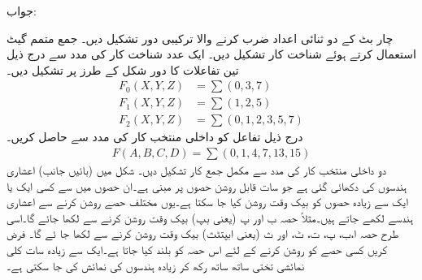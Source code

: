  جواب:
 \begin{center}
 \end{center}
 چار بٹ کے دو ثنائی اعداد ضرب کرنے والا ترکیبی دور تشکیل دیں۔
 جمع متمم گیٹ استعمال کرتے ہوئے  شناخت کار تشکیل دیں۔
ایک عدد   شناخت کار کی مدد سے   درج ذیل تین تفاعلات  کا دور  شکل   کے طرز پر تشکیل دیں۔
\begin{align*}
F_0(X,Y,Z)&=\sum(0,3,7)\\
F_1(X,Y,Z)&=\sum(1,2,5)\\
F_2(X,Y,Z)&=\sum(0,1,2,3,5,7)
\end{align*}
 درج ذیل تفاعل کو   داخلی منتخب کار کی مدد سے حاصل  کریں۔
 \begin{align*}
 F(A,B,C,D)=\sum(0,1,4,7,13,15)
 \end{align*}
 دو داخلی منتخب کار کی مدد سے  مکمل جمع کار  تشکیل دیں۔
 شکل   میں (بائیں جانب)  اعشاری ہندسوں کی   دکھائی  گئی ہے جو سات قابل روشن حصوں پر مبنی ہے۔ان حصوں میں سے  کسی ایک یا ایک سے زیادہ حصوں کو بیک وقت روشن کیا جا سکتا  ہے۔یوں مختلف حصے روشن کرنے سے اعشاری ہندسے لکھے  جاتے ہیں۔مثلاً   حصہ ب اور پ  (یعنی بپ)  بیک وقت روشن کرنے سے    لکھا جائے گا۔اسی طرح حصہ ا،ب،  پ، ت، ٹ، اور  ث (یعنی ابپتٹث)   بیک  وقت روشن کرنے سے  لکھا جا ئے گا۔   فرض کریں کسی حصے کو  روشن کرنے کے لئے اس حصہ  کو  بلند کیا جاتا ہے۔ایک سے زیادہ سات کلی نمائشی تختی ساتھ ساتھ رکھ کر زیادہ ہندسوں کی نمائش کی جا سکتی ہے۔
 
